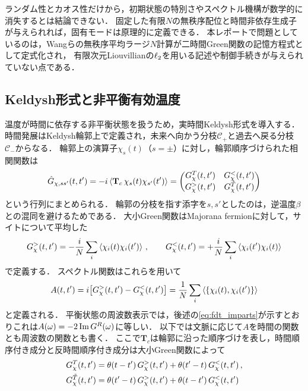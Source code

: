 \documentclass[a4paper,11pt,onecolumn,baselineskip=14.5pt]{jlreq}
\begin{document}
ランダム性とカオス性だけから，初期状態の特別さやスペクトル機構が数学的に消失するとは結論できない．
固定した有限$N$の無秩序配位と時間非依存生成子が与えられれば，固有モードは原理的に定義できる．
本レポートで問題としているのは，Wangらの無秩序平均ラージ$N$計算が二時間Green関数の記憶方程式として定式化され，
有限次元Liouvillianの$\ell_{2}$を用いる記述や制御手続きが与えられていない点である．

\subsection{Keldysh形式と非平衡有効温度}
\label{sec:appendix_keldysh}

温度が時間に依存する非平衡状態を扱うため，実時間Keldysh形式を導入する．
時間発展はKeldysh輪郭上で定義され，未来へ向かう分枝$\mathcal{C}_+$と過去へ戻る分枝$\mathcal{C}_-$からなる．
輪郭上の演算子$\chi_s(t)$（$s=\pm$）に対し，輪郭順序づけられた相関関数は
\begin{equation}
  \hat{G}_{\chi,ss'}(t,t')
  = -i\left\langle \mathbf{T}_c\,\chi_s(t)\chi_{s'}(t')\right\rangle
  = \begin{pmatrix}
      G_\chi^{T}(t,t') & G^{<}_\chi(t,t') \\
      G^{>}_\chi(t,t') & G_\chi^{\tilde{T}}(t,t')
    \end{pmatrix}
  \label{eq:contour_matrix}
\end{equation}
という行列にまとめられる\cite{Wang2024}．
輪郭の分枝を指す添字を$s,s'$としたのは，逆温度$\beta$との混同を避けるためである．
大小Green関数はMajorana fermionに対して，サイトについて平均した
\begin{equation}
  G^{>}_\chi(t,t') = -\frac{i}{N}\sum_i\left\langle \chi_i(t)\chi_i(t')\right\rangle\,,
  \qquad
  G^{<}_\chi(t,t') = +\frac{i}{N}\sum_i\left\langle \chi_i(t')\chi_i(t)\right\rangle
  \label{eq:greater_lesser}
\end{equation}
で定義する．
スペクトル関数はこれらを用いて
\begin{equation}
  A(t,t') = \ii\big[\Ggtr_\chi(t,t')-\Glss_\chi(t,t')\big]
  = \frac{1}{N}\sum_i\left\langle \acomm{\chi_i(t)}{\chi_i(t')}\right\rangle
  \label{eq:spectral_function}
\end{equation}
と定義される．
平衡状態の周波数表示では，後述の\eqref{eq:fdt_imparts}が示すとおりこれは$A(\omega)=-2\Im G^{R}(\omega)$に等しい．
以下では文脈に応じて$A$を時間の関数とも周波数の関数とも書く．
ここで$\mathbf{T}_c$は輪郭に沿った順序づけを表し，時間順序付き成分と反時間順序付き成分は大小Green関数によって
\begin{equation}
  \begin{aligned}
    G_\chi^{T}(t,t') &= \theta(t-t')\,G^{>}_\chi(t,t') + \theta(t'-t)\,G^{<}_\chi(t,t')\,, \\
    G_\chi^{\tilde{T}}(t,t') &= \theta(t'-t)\,G^{>}_\chi(t,t') + \theta(t-t')\,G^{<}_\chi(t,t')
  \end{aligned}
  \label{eq:T_tildeT}
\end{equation}
\end{document}
